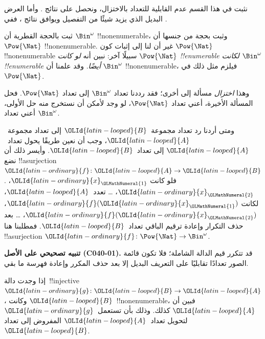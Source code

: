 \documentclass[../../../include/open-logic-section]{subfiles}
\begin{document}


\begin{editorial}
نثبت في هذا القسم عدم القابلية للتعداد بالاختزال، ونحصل على نتائج . وأما العرض البديل الذي يزيد شيئًا من التفصيل ويوافق نتائج ، ففي .
\end{editorial}

ثبت بالحجة القطرية أن $\Bin^\omega$ !!{nonenumerable}، وثبت بحجة من جنسها أن $\Pow{\Nat}$ !!{nonenumerable}. غير أن لنا إلى إثبات كون $\Pow{\Nat}$ !!{nonenumerable} سبيلًا آخر: نبين أنه \emph{لو كانت $\Pow{\Nat}$ !!{enumerable} لكانت $\Bin^\omega$ !!{enumerable} أيضًا}. وقد علمنا أن $\Bin^\omega$ !!{nonenumerable}، فيلزم مثل ذلك في $\Pow{\Nat}$.

وهذا \emph{اختزال} مسألة إلى أخرى؛ فقد رددنا تعداد $\Bin^\omega$ إلى تعداد $\Pow{\Nat}$. فحل المسألة الأخيرة، أعني تعداد $\Pow{\Nat}$، لو وجد لأمكن أن نستخرج منه حل الأولى، أعني تعداد $\Bin^\omega$.

ومتى أردنا رد تعداد مجموعة~$\OLId{latin-looped}{B}$ إلى تعداد مجموعة~$\OLId{latin-looped}{A}$، وجب أن نعين طريقًا يحول تعداد~$\OLId{latin-looped}{A}$ إلى تعداد~$\OLId{latin-looped}{B}$. وأيسر ذلك أن نضع !!a{surjection} $\OLId{latin-ordinary}{f}\colon \OLId{latin-looped}{A} \to \OLId{latin-looped}{B}$. فلو كانت $\OLId{latin-ordinary}{x}_\OLMathNumeral{1}$، $\OLId{latin-ordinary}{x}_\OLMathNumeral{2}$، \dots{} تعدد~$\OLId{latin-looped}{A}$، لكانت $\OLId{latin-ordinary}{f}(\OLId{latin-ordinary}{x}_\OLMathNumeral{1})$، $\OLId{latin-ordinary}{f}(\OLId{latin-ordinary}{x}_\OLMathNumeral{2})$، \dots{} بعد حذف التكرار وإعادة ترقيم الباقي تعداد~$\OLId{latin-looped}{B}$. فمطلبنا هنا !!a{surjection} $\OLId{latin-ordinary}{f}\colon \Pow{\Nat}
\to \Bin^\omega$.

\textbf{تنبيه تصحيحي على الأصل (C040-01).} قد تتكرر قيم الدالة الشاملة؛ فلا تكون
قائمة الصور تعدادًا تقابليًا على التعريف البديل إلا بعد حذف المكرر وإعادة
فهرسة ما بقي.

\begin{prob}
إذا وجدت دالة~!!{injective} $\OLId{latin-ordinary}{g}\colon \OLId{latin-looped}{B} \to \OLId{latin-looped}{A}$، وكانت $\OLId{latin-looped}{B}$~!!{nonenumerable}، فبين أن $\OLId{latin-looped}{A}$ كذلك. وذلك بأن تستعمل~$\OLId{latin-ordinary}{g}$ لتحويل تعداد~$\OLId{latin-looped}{A}$ المفروض إلى تعداد~$\OLId{latin-looped}{B}$.
\end{prob}
\end{document}
